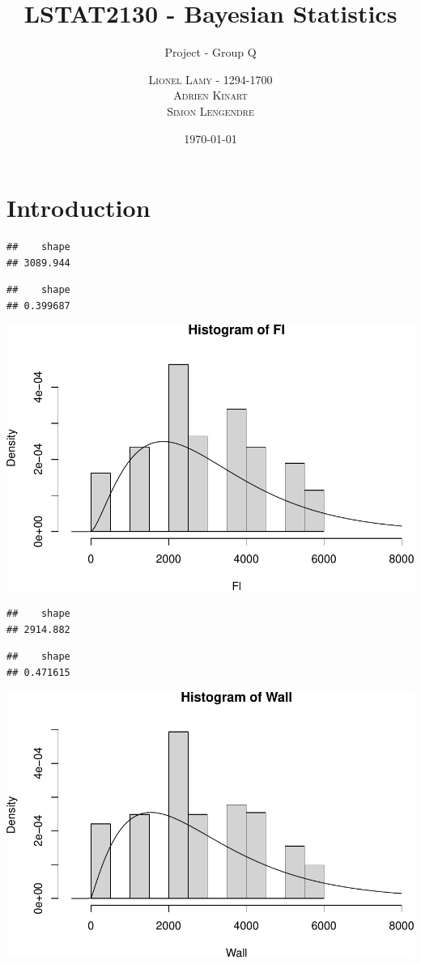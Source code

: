 \documentclass[a4paper, 12pt]{article}
\title{LSTAT2130 - Bayesian Statistics}
\subtitle{Project - Group Q}
\author{ \textsc{Lionel Lamy - 1294-1700}\\  \textsc{Adrien
Kinart}\\  \textsc{Simon Lengendre}\\ }
\institute{Université catholique de Louvain}
\date{\today}
\begin{document}
    \maketitle
    \tableofcontents
    \newpage
    
        
    
    \hypertarget{introduction}{%
    \section{Introduction}\label{introduction}}

\begin{verbatim}
##    shape 
## 3089.944
\end{verbatim}

\begin{verbatim}
##    shape 
## 0.399687
\end{verbatim}

    \begin{center}\includegraphics[width=0.8\linewidth]{resources/figs/flanders_wallonia-1} \end{center}

\begin{verbatim}
##    shape 
## 2914.882
\end{verbatim}

\begin{verbatim}
##    shape 
## 0.471615
\end{verbatim}

    \begin{center}\includegraphics[width=0.8\linewidth]{resources/figs/flanders_wallonia-2} \end{center}
\end{document}
